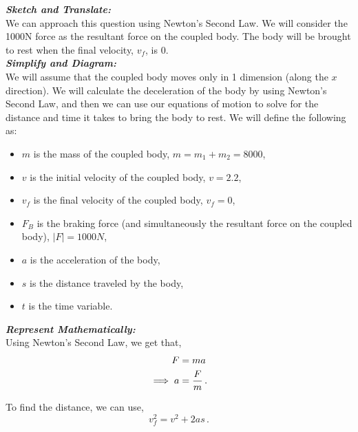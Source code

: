 \begin{subquestions}
\begin{subsubquestions}

\subsubquestion

\textbf{\textit{Sketch and Translate:}} \\
We can approach this question using Newton's Second Law. We will consider the 1000N force as the resultant force on the coupled body. The body will be brought to rest when the final velocity, $v_f$, is 0.\\




\textbf{\textit{Simplify and Diagram:}} \\
We will assume that the coupled body moves only in 1 dimension (along the $x$ direction). We will calculate the deceleration of the body by using Newton's Second Law, and then we can use our equations of motion to solve for the distance and time it takes to bring the body to rest. We will define the following as:
\begin{itemize}
	\item $m$ is the mass of the coupled body, $m=m_1+m_2=8000$,
	\item $v$ is the initial velocity of the coupled body, $v=2.2$,
	\item $v_f$ is the final velocity of the coupled body, $v_f=0$,
	\item $F_B$ is the braking force (and simultaneously the resultant force on the coupled body), $|F|=1000N$,
	\item $a$ is the acceleration of the body,
	\item $s$ is the distance traveled by the body,
	\item $t$ is the time variable.
\end{itemize}



\textbf{\textit{Represent Mathematically:}} \\ 
Using Newton's Second Law, we get that,
\begin{align}
	F & = ma \nonumber \\
	\implies a & = \frac{F}{m} \label{2008J:q5:AEqn1} \,.
\end{align}

To find the distance, we can use,
\begin{equation}
	v_f^2 = v^2 + 2as \label{2008J:q5:SEqn1} \,.
\end{equation}


\end{subsubquestions}
\end{subquestions}
